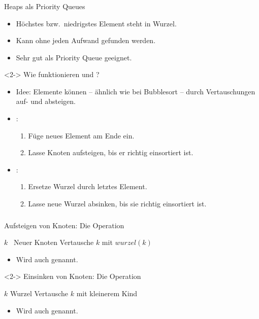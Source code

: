 \begin{frame}
\frametitle{\insertsection}
\begin{block}
{Heaps als Priority Queues}
\begin{itemize}
	\item Höchstes bzw.\ niedrigstes Element steht in Wurzel.
	\item Kann ohne jeden Aufwand gefunden werden.
	\item[\positive] Sehr gut als Priority Queue geeignet. 
\end{itemize}
\end{block}
\begin{block}<2->
{Wie funktionieren  und ?}
\begin{itemize}
	\item Idee: Elemente können -- ähnlich wie bei Bubblesort -- durch Vertauschungen auf- und absteigen.
	\item {}: 
	\begin{enumerate}
		\item Füge neues Element am Ende ein.
		\item Lasse Knoten aufsteigen, bis er richtig einsortiert ist.
	\end{enumerate}
	\item {}:
	\begin{enumerate}
		\item Ersetze Wurzel durch letztes Element.
		\item Lasse neue Wurzel absinken, bis sie richtig einsortiert ist.
	\end{enumerate}
\end{itemize}
\end{block}
\end{frame}

\begin{frame}
\frametitle{\insertsection}
\begin{block}
{Aufsteigen von Knoten: Die Operation \alert{}}
\begin{algorithmic}
	\State $k$ \gets\ Neuer Knoten
		\State Vertausche $k$ mit $wurzel(k)$
	\EndWhile
\end{algorithmic}
\begin{itemize}
	\item Wird auch  genannt.
\end{itemize}
\end{block}

\begin{block}<2->
{Einsinken von Knoten: Die Operation \alert{}}
\begin{algorithmic}
	\State $k$ \gets Wurzel
		\State Vertausche $k$ mit kleinerem Kind
	\EndWhile
\end{algorithmic}
\begin{itemize}
	\item Wird auch  genannt.
\end{itemize}
\end{block}
\end{frame}


